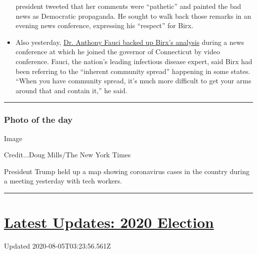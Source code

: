 \begin{itemize}
  president tweeted that her comments were ``pathetic'' and painted the
  bad news as Democratic propaganda. He sought to walk back those
  remarks in an evening news conference, expressing his ``respect'' for
  Birx.
\item
  Also yesterday,
  \href{https://www.nytimes3xbfgragh.onion/2020/08/03/world/coronavirus-covid-19.html\#link-4e40df05}{Dr.
  Anthony Fauci backed up Birx's analysis} during a news conference at
  which he joined the governor of Connecticut by video conference.
  Fauci, the nation's leading infectious disease expert, said Birx had
  been referring to the ``inherent community spread'' happening in some
  states. ``When you have community spread, it's much more difficult to
  get your arms around that and contain it,'' he said.
\end{itemize}

\begin{center}\rule{0.5\linewidth}{\linethickness}\end{center}

\hypertarget{photo-of-the-day}{%
\subsubsection{Photo of the day}\label{photo-of-the-day}}

Image

Credit...Doug Mills/The New York Times

President Trump held up a map showing coronavirus cases in the country
during a meeting yesterday with tech workers.

\begin{center}\rule{0.5\linewidth}{\linethickness}\end{center}

\hypertarget{latest-updates-2020-election}{%
\section{\texorpdfstring{\href{https://www.nytimes3xbfgragh.onion/2020/08/04/us/elections/primary-election-michigan-arizona-kansas.html?action=click\&pgtype=Article\&state=default\&region=MAIN_CONTENT_1\&context=storylines_live_updates}{Latest
Updates: 2020
Election}}{Latest Updates: 2020 Election}}\label{latest-updates-2020-election}}

Updated 2020-08-05T03:23:56.561Z


